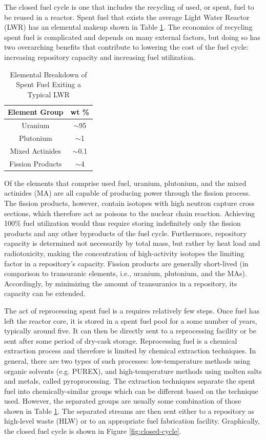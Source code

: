 The closed fuel cycle is one that includes the recycling of used, or spent, fuel
to be reused in a reactor. Spent fuel that exists the average Light Water
Reactor (LWR) has an elemental makeup shown in Table \ref{tab:lwr_fuel}. The
economics of recycling spent fuel is complicated and depends on many external
factors, but doing so has two overarching benefits that contribute to lowering
the cost of the fuel cycle: increasing repository capacity and increasing fuel
utilization. 

\begin{table} [h]
\centering
\begin{tabular} {|c|c|} 
\hline
Element Group & wt \% \\
\hline
Uranium           & $\mathrm{\sim}$95  \\
Plutonium         & $\mathrm{\sim}$1   \\
Mixed Actinides   & $\mathrm{\sim}$0.1 \\
Fission Products  & $\mathrm{\sim}$4   \\
\hline
\end{tabular}
\caption{Elemental Breakdown of Spent Fuel Exiting a Typical LWR}
\label{tab:lwr_fuel}
\end{table}

Of the elements that comprise used fuel, uranium, plutonium, and the mixed
actinides (MA) are all capable of producing power through the fission
process. The fission products, however, contain isotopes with high neutron
capture cross sections, which therefore act as poisons to the nuclear chain
reaction.  Achieving 100\% fuel utilization would thus require storing
indefinitely only the fission products and any other byproducts of the fuel
cycle. Furthermore, repository capacity is determined not necessarily by total
mass, but rather by heat load and radiotoxicity, making the concentration of
high-activity isotopes the limiting factor in a repository's capacity. Fission
products are generally short-lived (in comparison to transuranic elements, i.e.,
uranium, plutonium, and the MAs). Accordingly, by minimizing the amount of
transuranics in a repository, its capacity can be extended.

The act of reprocessing spent fuel is a requires relatively few steps. Once fuel
has left the reactor core, it is stored in a spent fuel pool for a some number
of years, typically around five. It can then be directly sent to a reprocessing
facility or be sent after some period of dry-cask storage. Reprocessing fuel is
a chemical extraction process and therefore is limited by chemical extraction
techniques. In general, there are two types of such processes: low-temperature
methods using organic solvents (e.g. PUREX), and high-temperature methods using
molten salts and metals, called pyroprocessing. The extraction techniques
separate the spent fuel into chemically-similar groups which can be different
based on the technique used. However, the separated groups are usually some
combination of those shown in Table \ref{tab:lwr_fuel}. The separated streams
are then sent either to a repository as high-level waste (HLW) or to an
appropriate fuel fabrication facility. Graphically, the closed fuel cycle is
shown in Figure \ref{fig:closed-cycle}.

